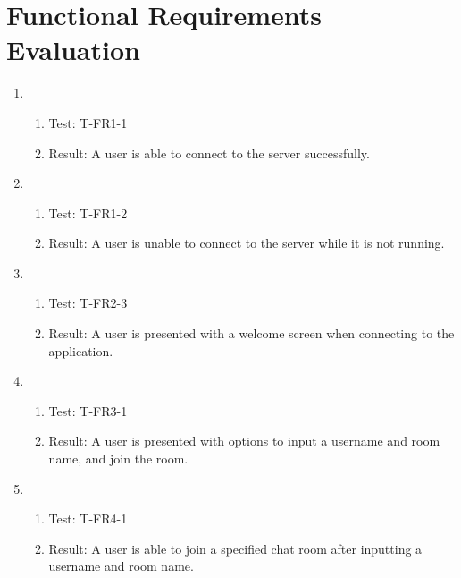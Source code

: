 \documentclass[12pt, titlepage]{article}
\begin{document}
\section{Functional Requirements Evaluation}
    \begin{enumerate}[\indent {}]
        \setlength{\itemsep}{30pt}
        \item 
            \begin{enumerate}[ ]
                \item Test: T-FR1-1
                \item Result: A user is able to connect to the server successfully.
            \end{enumerate}
        
        \item 
            \begin{enumerate}[ ]
                \item Test: T-FR1-2
                \item Result: A user is unable to connect to the server while it is not running.
            \end{enumerate}
            
        \item 
            \begin{enumerate}[ ]
                \item Test: T-FR2-3
                \item Result: A user is presented with a welcome screen when connecting to the application.
            \end{enumerate}
    
        \item 
            \begin{enumerate}[ ]
                \item Test: T-FR3-1
                \item Result: A user is presented with options to input a username and room name, and join the room.
            \end{enumerate}
            
        \item 
            \begin{enumerate}[ ]
                \item Test: T-FR4-1
                \item Result: A user is able to join a specified chat room after inputting a username and room name.
            \end{enumerate}
        

\end{enumerate}
\end{document}
